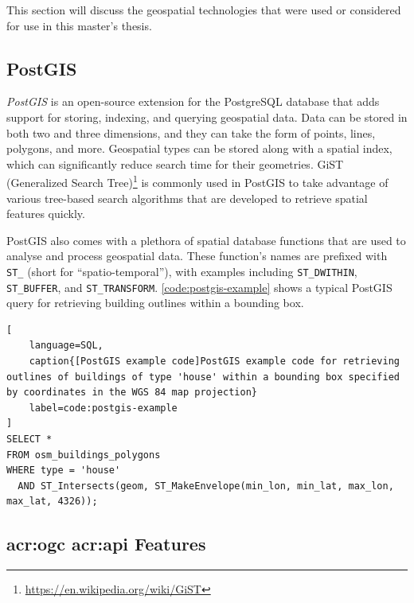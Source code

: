 This section will discuss the geospatial technologies that were used or considered for use in this master's thesis.

\subsection{PostGIS}
\label{subsec:postgis}

\textit{PostGIS} \citep{PostGIS2001} is an open-source extension for the PostgreSQL database that adds support for storing, indexing, and querying geospatial data. Data can be stored in both two and three dimensions, and they can take the form of points, lines, polygons, and more. Geospatial types can be stored along with a spatial index, which can significantly reduce search time for their geometries. GiST (Generalized Search Tree)\footnote{\url{https://en.wikipedia.org/wiki/GiST}} is commonly used in PostGIS to take advantage of various tree-based search algorithms that are developed to retrieve spatial features quickly.

PostGIS also comes with a plethora of spatial database functions that are used to analyse and process geospatial data. These function's names are prefixed with \texttt{ST\_} (short for \enquote{spatio-temporal}), with examples including \texttt{ST\_DWITHIN}, \texttt{ST\_BUFFER}, and \texttt{ST\_TRANSFORM}. \autoref{code:postgis-example} shows a typical PostGIS query for retrieving building outlines within a bounding box.

\begin{lstlisting}[
    language=SQL,
    caption{[PostGIS example code]PostGIS example code for retrieving outlines of buildings of type 'house' within a bounding box specified by coordinates in the WGS 84 map projection}
    label=code:postgis-example
]
SELECT * 
FROM osm_buildings_polygons 
WHERE type = 'house' 
  AND ST_Intersects(geom, ST_MakeEnvelope(min_lon, min_lat, max_lon, max_lat, 4326));
\end{lstlisting}

\subsection[OGC API Features]{\acrshort{acr:ogc} \acrshort{acr:api} Features}
\label{subsec:ogc-api-features}

